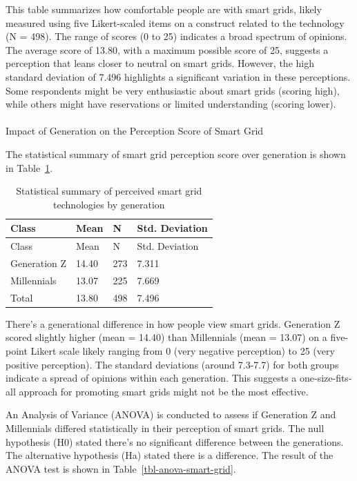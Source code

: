 \documentclass[
  letterpaper,
  DIV=11,
  numbers=noendperiod]{scrartcl}
\makeatletter
\let\oldparagraph\paragraph
\renewcommand{\paragraph}{
    \@ifstar
      \xxxParagraphStar
      \xxxParagraphNoStar
  }
\newcommand{\xxxParagraphStar}[1]{\oldparagraph*{#1}\mbox{}}
\newcommand{\xxxParagraphNoStar}[1]{\oldparagraph{#1}\mbox{}}
\makeatother
\begin{document}
This table summarizes how comfortable people are with smart grids,
likely measured using five Likert-scaled items on a construct related to
the technology (N = 498). The range of scores (0 to 25) indicates a
broad spectrum of opinions. The average score of 13.80, with a maximum
possible score of 25, suggests a perception that leans closer to neutral
on smart grids. However, the high standard deviation of 7.496 highlights
a significant variation in these perceptions. Some respondents might be
very enthusiastic about smart grids (scoring high), while others might
have reservations or limited understanding (scoring lower).

\paragraph{Impact of Generation on the Perception Score of Smart
Grid}\label{impact-of-generation-on-the-perception-score-of-smart-grid}

The statistical summary of smart grid perception score over generation
is shown in Table~\ref{tbl-smart-grid-generation}.

\begin{longtable}[]{@{}llll@{}}
\caption{Statistical summary of perceived smart grid technologies by
generation}\label{tbl-smart-grid-generation}\tabularnewline
\toprule\noalign{}
Class & Mean & N & Std. Deviation \\
\midrule\noalign{}
\endfirsthead
\toprule\noalign{}
Class & Mean & N & Std. Deviation \\
\midrule\noalign{}
\endhead
\bottomrule\noalign{}
\endlastfoot
Generation Z & 14.40 & 273 & 7.311 \\
Millennials & 13.07 & 225 & 7.669 \\
Total & 13.80 & 498 & 7.496 \\
\end{longtable}

There's a generational difference in how people view smart grids.
Generation Z scored slightly higher (mean = 14.40) than Millennials
(mean = 13.07) on a five-point Likert scale likely ranging from 0 (very
negative perception) to 25 (very positive perception). The standard
deviations (around 7.3-7.7) for both groups indicate a spread of
opinions within each generation. This suggests a one-size-fits-all
approach for promoting smart grids might not be the most effective.

An Analysis of Variance (ANOVA) is conducted to assess if Generation Z
and Millennials differed statistically in their perception of smart
grids. The null hypothesis (H0) stated there's no significant difference
between the generations. The alternative hypothesis (Ha) stated there is
a difference. The result of the ANOVA test is shown in
Table~\ref{tbl-anova-smart-grid}.
\end{document}
